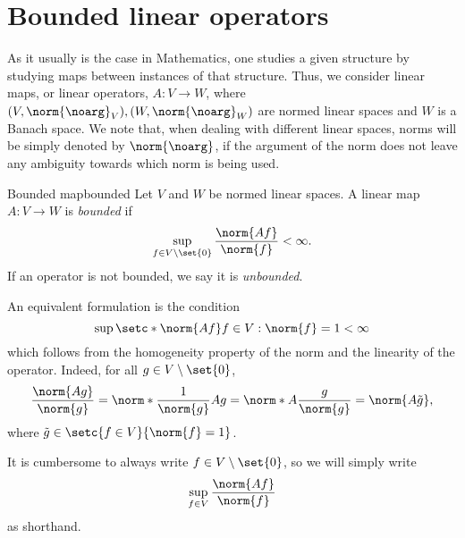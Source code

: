 \section{Bounded linear operators}
As it usually is the case in Mathematics, one studies a given structure by studying maps between instances of that structure. Thus, we consider linear maps, or linear operators, \(A : V \to W\), where \((V, \norm{\noarg}_V),(W, \norm{\noarg}_W)\) are normed linear spaces and \(W\) is a Banach space. We note that, when dealing with different linear spaces, norms will be simply denoted by \(\norm{\noarg}\), if the argument of the norm does not leave any ambiguity towards which norm is being used.

\begin{definition}{Bounded map}{bounded}
    Let \(V\) and \(W\) be normed linear spaces. A linear map \(A : V \to W\) is \emph{bounded} if
    \begin{equation*}
        \sup_{f\in V\setminus\set{0}} \frac{\norm{A f}}{\norm{f}} < \infty.
    \end{equation*}
    If an operator is not bounded, we say it is \emph{unbounded}.
\end{definition}
\begin{remark}
    An equivalent formulation is the condition
    \begin{equation*}
        \sup{\setc*{\norm{Af}}{f \in V : \norm{f} = 1}} < \infty
    \end{equation*}
    which follows from the homogeneity property of the norm and the linearity of the operator. Indeed, for all \(g \in V\setminus\set{0}\),
    \begin{equation*}
        \frac{\norm{Ag}}{\norm{g}} = \norm*{\frac{1}{\norm{g}}Ag} = \norm*{A\frac{g}{\norm{g}}} = \norm{A\tilde{g}},
    \end{equation*}
    where \(\tilde{g} \in \setc{f \in V}{\norm{f} = 1}\).
\end{remark}
\begin{remark}
    It is cumbersome to always write \(f \in V \setminus\set{0}\), so we will simply write
    \begin{equation*}
        \sup_{f \in V} \frac{\norm{Af}}{\norm{f}}
    \end{equation*}
    as shorthand.
\end{remark}

